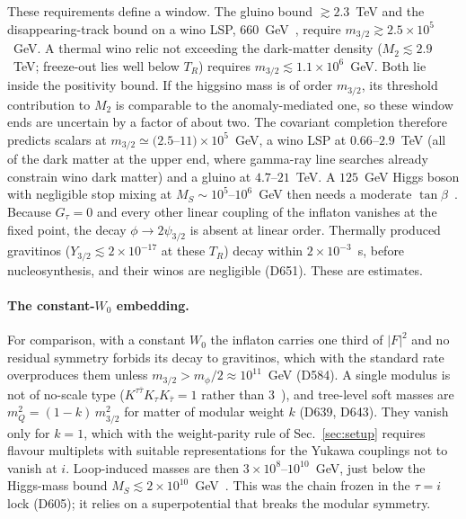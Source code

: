 \documentclass[aps,prd,twocolumn,superscriptaddress,nofootinbib,floatfix]{revtex4-2}
\begin{document}
These requirements define a window. The gluino bound $\gtrsim2.3$~TeV and the disappearing-track bound on a wino LSP, $660$~GeV~\cite{arXiv_2201_02472}, require $m_{3/2}\gtrsim2.5\times10^5$~GeV. A thermal wino relic not exceeding the dark-matter density ($M_2\lesssim2.9$~TeV; freeze-out lies well below $T_R$) requires $m_{3/2}\lesssim1.1\times10^6$~GeV. Both lie inside the positivity bound. If the higgsino mass is of order $m_{3/2}$, its threshold contribution to $M_2$ is comparable to the anomaly-mediated one, so these window ends are uncertain by a factor of about two. The covariant completion therefore predicts scalars at $m_{3/2}\simeq(2.5$--$11)\times10^5$~GeV, a wino LSP at $0.66$--$2.9$~TeV (all of the dark matter at the upper end, where gamma-ray line searches already constrain wino dark matter) and a gluino at $4.7$--$21$~TeV. A $125$~GeV Higgs boson with negligible stop mixing at $M_S\sim10^5$--$10^6$~GeV then needs a moderate $\tan\beta$~\cite{arXiv_1407_4081}. Because $G_\tau=0$ and every other linear coupling of the inflaton vanishes at the fixed point, the decay $\phi\to2\psi_{3/2}$ is absent at linear order. Thermally produced gravitinos ($Y_{3/2}\lesssim2\times10^{-17}$ at these $T_R$) decay within $2\times10^{-3}$~s, before nucleosynthesis, and their winos are negligible (D651). These are estimates.

\paragraph{The constant-$W_0$ embedding.} For comparison, with a constant $W_0$ the inflaton carries one third of $|F|^2$ and no residual symmetry forbids its decay to gravitinos, which with the standard rate~\cite{arXiv_hep-ph_0611166} overproduces them unless $m_{3/2}>m_\phi/2\approx10^{11}$~GeV (D584). A single modulus is not of no-scale type ($K^{\tau\bar\tau}K_\tau K_{\bar\tau}=1$ rather than $3$~\cite{arXiv_1305_1247}), and tree-level soft masses are $m_Q^2=(1-k)\,m_{3/2}^2$ for matter of modular weight $k$ (D639, D643). They vanish only for $k=1$, which with the weight-parity rule of Sec.~\ref{sec:setup} requires flavour multiplets with suitable representations for the Yukawa couplings not to vanish at $i$. Loop-induced masses are then $3\times10^8$--$10^{10}$~GeV, just below the Higgs-mass bound $M_S\lesssim2\times10^{10}$~GeV~\cite{arXiv_1407_4081}. This was the chain frozen in the $\tau=i$ lock (D605); it relies on a superpotential that breaks the modular symmetry.
\end{document}
